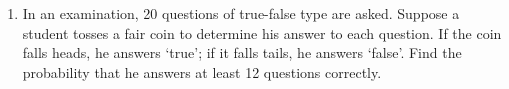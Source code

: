 \documentclass[]{article}
\begin{document}
\begin{enumerate}
\item In an examination, 20 questions of true-false type are asked. Suppose a student tosses a fair coin to determine his answer to each question. If the coin falls heads, he answers `true'; if it falls tails, he answers `false'. Find the probability that he answers at least 12 questions correctly.
\end{enumerate}
\end{document}
